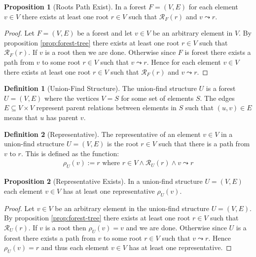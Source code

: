 \documentclass[a4paper,12pt]{article}
\theoremstyle{definition}
\newtheorem{definition}{Definition}[section]
\newtheorem{proposition}{Proposition}[section]
\begin{document}
\begin{proposition}[Roots Path Exist]
    In a forest $F = (V, E)$ for each element $v \in V$ there exists at least
    one root $r \in V$ such that $\mathcal{R}_F(r)$ and $v \leadsto r$.
\end{proposition}

\begin{proof}
    Let $F = (V, E)$ be a forest and let $v \in V$ be an arbitrary element in
    $V$. By proposition \ref{prop:forest-tree} there exists at least one root $r
    \in V$ such that $\mathcal{R}_F(r)$. If $v$ is a root then we are done.
    Otherwise since $F$ is forest there exists a path from $v$ to some root $r
    \in V$ such that $v \leadsto r$. Hence for each element $v \in V$ there
    exists at least one root $r \in V$ such that $\mathcal{R}_F(r)$ and $v
    \leadsto r$.
\end{proof}

\begin{definition}[Union-Find Structure]
    The union-find structure $U$ is a forest $U = (V, E)$ where the
    vertices $V = S$ for some set of elements $S$. The edges $E \subseteq V \times V$ represent parent
    relations between elements in $S$ such that $(u, v) \in E$ means that $u$ has
    parent $v$.
\end{definition}

\begin{definition}[Representative]
    The representative of an element $v \in V$ in a union-find structure $U =
    (V, E)$ is the root $r \in V$ such that there is a path from $v$ to $r$.
    This is defined as the function:
    \begin{align*}
        \rho_U(v) := r \text{ where } r \in V \land \mathcal{R}_U(r) \land v \leadsto r
    \end{align*}
\end{definition}

\begin{proposition}[Representative Exists]
    In a union-find structure $U = (V, E)$ each element $v \in V$ has at least
    one representative $\rho_U(v)$.
\end{proposition}

\begin{proof}
    Let $v \in V$ be an arbitrary element in the union-find structure $U =
    (V, E)$. By proposition \ref{prop:forest-tree} there exists at least one root
    $r \in V$ such that $\mathcal{R}_U(r)$. If $v$ is a root then $\rho_U(v) = v$
    and we are done. Otherwise since $U$ is a forest there exists a path from
    $v$ to some root $r \in V$ such that $v \leadsto r$. Hence $\rho_U(v) = r$
    and thus each element $v \in V$ has at least one representative.
\end{proof}
\end{document}
